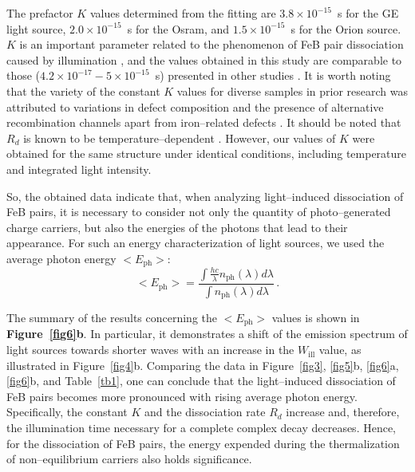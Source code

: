 \documentclass{WileyMSP-template}
\begin{document}
The prefactor $K$ values determined from the fitting are
$3.8\times10^{-15}$~s for the GE light source,
$2.0\times10^{-15}$~s for the Osram, and
$1.5\times10^{-15}$~s for the Orion source.
$K$ is an important parameter related to the phenomenon of FeB pair dissociation caused by illumination \cite{FeBKin2019},
and the values obtained in this study are comparable to those ($4.2\times10^{-17}-5\times10^{-15}$~s) presented in other studies \cite{FeBLight2,FeBAssJAP2014,FeBKin2019}.
It is worth noting that the variety of the constant $K$ values for diverse samples in prior research was attributed
to variations in defect composition and the presence of alternative recombination channels apart from iron--related defects \cite{FeBLight2,FeBAssJAP2014}.
It should be noted that $R_d$ is known to be temperature--dependent \cite{Lagowskii1993}.
However, our values of $K$ were obtained for the same structure under identical conditions, including temperature and integrated light intensity.

So, the obtained data indicate that, when analyzing light--induced dissociation of FeB pairs,
it is necessary to consider not only the quantity of photo--generated charge carriers,
but also the energies of the photons that lead to their appearance.
For such an energy characterization of light sources, we used the average photon energy $<E_\mathrm{ph}>$:
\begin{equation}
\label{eqEaver}
<E_\mathrm{ph}>=\frac{\int \frac{hc}{\lambda}n_\mathrm{ph}(\lambda)d\lambda}{\int n_\mathrm{ph}(\lambda)d\lambda}\,.
\end{equation}


The summary of the results concerning the $<E_\mathrm{ph}>$ values is shown in \textbf{Figure~\ref{fig6}b}.
In particular, it demonstrates a shift of the emission spectrum of light sources
towards shorter waves with an increase in the $W_\mathrm{ill}$ value, as illustrated in Figure~\ref{fig4}b.
Comparing the data in Figure~\ref{fig3}, \ref{fig5}b, \ref{fig6}a, \ref{fig6}b, and Table~\ref{tb1}, one can conclude that
the light--induced dissociation of FeB pairs becomes more pronounced with rising average photon energy.
Specifically, the constant $K$ and the dissociation rate $R_d$ increase and, therefore, the illumination time necessary for a complete complex decay decreases.
Hence, for the dissociation of FeB pairs, the energy expended during the thermalization of non--equilibrium carriers also holds significance.
\end{document}
